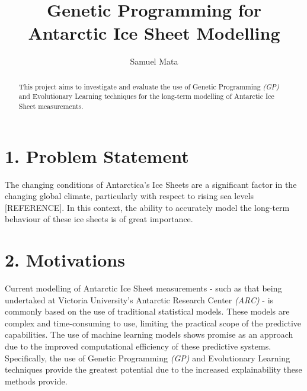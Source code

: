 \documentclass[11pt, a4paper, twoside, openright]{report}
\title{Genetic Programming for Antarctic Ice Sheet Modelling}
\author{Samuel Mata}
\date{}
\begin{document}
\frontmatter


\begin{abstract}
  This project aims to investigate and evaluate the use of Genetic
  Programming \textit{(GP)} and Evolutionary Learning techniques for
  the long-term modelling of Antarctic Ice Sheet measurements. 
\end{abstract}


\maketitle




\mainmatter


\section*{1. Problem Statement}

The changing conditions of Antarctica's Ice Sheets are a significant
factor in the changing global climate, particularly with respect to
rising sea levels [REFERENCE]. In this context, the ability to
accurately model the long-term behaviour of these ice sheets is
of great importance.

\section*{2. Motivations}

Current modelling of Antarctic Ice Sheet measurements - such as
that being undertaked at Victoria University's Antarctic Research
Center \textit{(ARC)} - is commonly based on the use of traditional
statistical models. These models are complex and time-consuming to 
use, limiting the practical scope of the predictive capabilities. 
The use of machine learning models shows promise as an approach due to the
improved computational efficiency of these predictive systems. 
Specifically, the use of Genetic Programming \textit{(GP)} and
Evolutionary Learning techniques provide the greatest potential
due to the increased explainability these methods provide.
\end{document}

